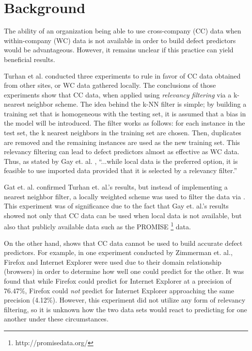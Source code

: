 \documentclass{sig-alternate}
\begin{document}

\section{Background}

The ability of an organization being able to use cross-company (CC) data 
when within-company (WC) data is not available in order to build 
defect predictors would be advantageous. However, it remains unclear 
if this practice can yield beneficial results.  
	
Turhan et al. conducted three experiments to rule in favor of CC data obtained from other sites, or WC data gathered locally. The conclusions of those experiments show that CC data, when applied using {\em relevancy filtering} via a k-nearest neighbor scheme. The idea behind the k-NN filter is simple; by building a training set that is homogeneous with the testing set, it is assumed that a bias in the model will be introduced. The filter works as follows: for each instance in the test set, the k nearest neighbors in the training set are chosen. Then, duplicates are removed and the remaining instances are used as the new training set. This relevancy filtering can lead to defect predictors almost as effective as WC data. Thus, as stated by Gay et. al. \cite{gay09}, ``...while local data is the preferred option, it is feasible to use imported data provided that it is selected by a relevancy filter.''

Gat et. al. confirmed Turhan et. al.'s results, but instead of implementing a nearest neighbor filter, a locally weighted scheme was used to filter the data via \cite{hallLWL}. This experiment was of significance due to the fact that Gay et. al.'s results showed not only that CC data can be used when local data is not available, but also that publicly available data such as the PROMISE \footnote{http://promisedata.org/} data.

On the other hand, \cite{zimmerman09} shows that CC data cannot be used to build accurate defect predictors. For example, in one experiment conducted by Zimmerman et. al., Firefox and Internet Explorer were used due to their domain relationship (browsers) in order to determine how well one could predict for the other. It was found that while Firefox could predict for Internet Explorer at a precision of 76.47\%, Firefox could {\em not} predict for Internet Explorer approaching the same precision (4.12\%). However, this experiment did not utilize any form of relevancy filtering, so it is unknown how the two data sets would react to predicting for one another under these circumstances. 
\end{document}
